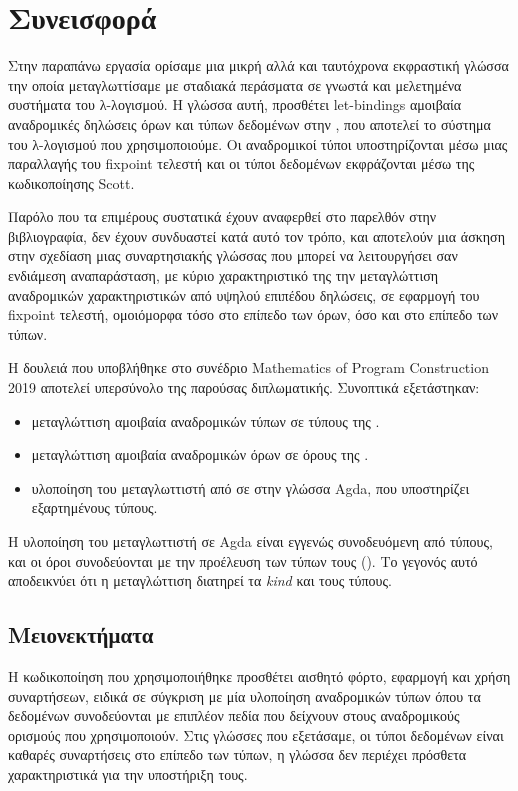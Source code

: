 \section{Συνεισφορά}
Στην παραπάνω εργασία ορίσαμε μια μικρή αλλά και ταυτόχρονα εκφραστική γλώσσα
την οποία μεταγλωττίσαμε με σταδιακά περάσματα σε γνωστά και μελετημένα συστήματα του λ-λογισμού.
Η γλώσσα αυτή, \FIR{} προσθέτει let-bindings αμοιβαία αναδρομικές δηλώσεις όρων και τύπων δεδομένων
στην \FOMF, που αποτελεί το σύστημα του λ-λογισμού που χρησιμοποιούμε. Οι αναδρομικοί τύποι
υποστηρίζονται μέσω μιας παραλλαγής του fixpoint τελεστή και οι τύποι δεδομένων εκφράζονται
μέσω της κωδικοποίησης Scott.

Παρόλο που τα επιμέρους συστατικά έχουν αναφερθεί στο παρελθόν στην βιβλιογραφία, δεν έχουν
συνδυαστεί κατά αυτό τον τρόπο, και αποτελούν μια άσκηση στην σχεδίαση μιας συναρτησιακής
γλώσσας που μπορεί να λειτουργήσει σαν ενδιάμεση αναπαράσταση, με κύριο χαρακτηριστικό της
την μεταγλώττιση αναδρομικών χαρακτηριστικών από υψηλού επιπέδου δηλώσεις, σε εφαρμογή
του fixpoint τελεστή, ομοιόμορφα τόσο στο επίπεδο των όρων, όσο και στο επίπεδο των τύπων.

Η δουλειά που υποβλήθηκε στο συνέδριο Μathematics of Program Construction 2019  αποτελεί υπερσύνολο
της παρούσας διπλωματικής. Συνοπτικά
εξετάστηκαν:
\begin{itemize}
\item μεταγλώττιση αμοιβαία αναδρομικών τύπων σε τύπους της \FOMF{}.
\item μεταγλώττιση αμοιβαία αναδρομικών όρων σε όρους της \FOMF{}.
\item υλοποίηση του μεταγλωττιστή από \FIR{} σε \FOMF{} στην γλώσσα Agda, που υποστηρίζει
εξαρτημένους τύπους.
\end{itemize}
Η υλοποίηση του μεταγλωττιστή σε Agda είναι εγγενώς συνοδευόμενη από τύπους, και οι όροι συνοδεύονται με την προέλευση των τύπων τους (\cite{altenkirch}). Το γεγονός αυτό αποδεικνύει ότι η μεταγλώττιση διατηρεί τα \emph{kind} και τους τύπους. 


\subsection{Μειονεκτήματα}

Η κωδικοποίηση που χρησιμοποιήθηκε προσθέτει αισθητό φόρτο, εφαρμογή και χρήση συναρτήσεων, ειδικά
σε σύγκριση με μία υλοποίηση αναδρομικών τύπων όπου τα δεδομένων συνοδεύονται με επιπλέον πεδία που
δείχνουν στους αναδρομικούς ορισμούς που χρησιμοποιούν. Στις γλώσσες που εξετάσαμε, οι τύποι δεδομένων είναι καθαρές συναρτήσεις στο επίπεδο των τύπων, η γλώσσα δεν περιέχει πρόσθετα χαρακτηριστικά για την υποστήριξη τους.

